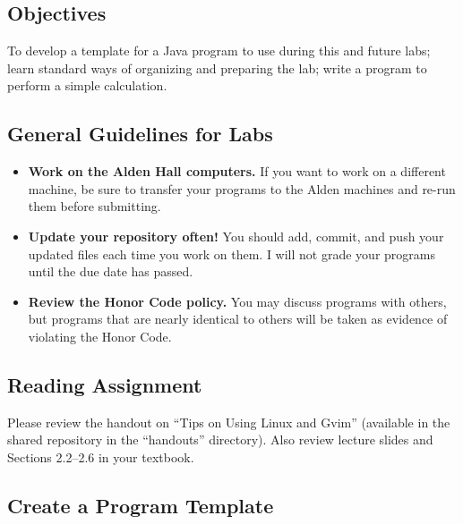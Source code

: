 



\subsection*{Objectives}

To develop a template for a Java program to use during this and future labs; learn standard ways of organizing and
preparing the lab; write a program to perform a simple calculation.

\subsection*{General Guidelines for Labs}

\begin{itemize}
\item
{\bf Work on the Alden Hall computers.} If you want to work on a different
machine, be sure to transfer your programs to the Alden
machines and re-run them before submitting.
\item
{\bf Update your repository often!} You should add, commit, 
and push your updated files each time you work on them.  I will not grade 
your programs until the due date has passed.
\item
{\bf Review the Honor Code policy.} You
may discuss programs with others, but programs that are nearly identical
to others will be taken as evidence of violating the Honor Code.
\end{itemize}

\subsection*{Reading Assignment}

Please review the handout on ``Tips on Using Linux and Gvim'' (available in the shared repository in the ``handouts''
  directory).  Also review lecture slides and Sections 2.2--2.6 in your textbook.

\subsection*{Create a Program Template}

